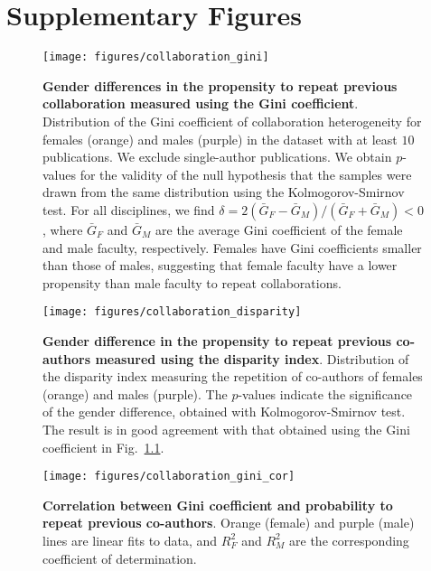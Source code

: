\chapter{Supplementary Figures}
\label{ch:sup_figures}

\begin{figure}[t]
\texttt{[image: figures/collaboration\_gini]}
\caption[Distribution of the Gini coefficient of collaboration.]{\textbf{Gender differences in the propensity to repeat previous collaboration measured using the Gini coefficient}. Distribution of the Gini coefficient of collaboration heterogeneity \cite{Ceriani2011} for females (orange) and males (purple) in the dataset with at least $10$ publications. We exclude single-author publications. We obtain $p$-values for the validity of the null hypothesis that the samples were drawn from the same distribution using the Kolmogorov-Smirnov test. For all disciplines, we find $\delta=2(\bar{G}_F-\bar{G}_M)/(\bar{G}_F+\bar{G}_M)<0$, where $\bar{G}_F$ and $\bar{G}_M$ are the average Gini coefficient of the female and male faculty, respectively. Females have Gini coefficients smaller than those of males, suggesting that female faculty have a lower propensity than male faculty to repeat collaborations.}
\label{fig:collaboration:gini}
\end{figure}

\clearpage

\begin{figure}[t]
\texttt{[image: figures/collaboration\_disparity]}
\caption[Distribution of the disparity index for repeating co-authors.]{\textbf{Gender difference in the propensity to repeat previous co-authors measured using the disparity index}. Distribution of the disparity index measuring the repetition of co-authors of females (orange) and males (purple). The $p$-values indicate the significance of the gender difference, obtained with Kolmogorov-Smirnov test. The result is in good agreement with that obtained using the Gini coefficient in Fig.~\ref{fig:collaboration:gini}.}
\label{fig:collaboration:disparity}
\end{figure}

\clearpage

\begin{figure}[t]
\texttt{[image: figures/collaboration\_gini\_cor]}
\caption[Correlation between Gini coefficient and probability to repeat co-authors.]{\textbf{Correlation between Gini coefficient and probability to repeat previous co-authors}. Orange (female) and purple (male) lines are linear fits to data, and $R^2_F$ and $R^2_M$ are the corresponding coefficient of determination.}
\label{fig:collaboration:gini_cor}
\end{figure}


